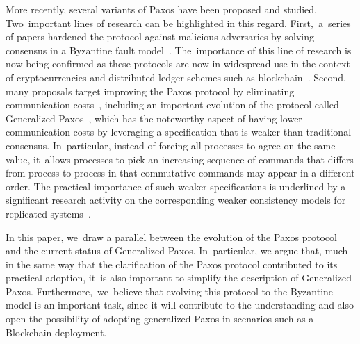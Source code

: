 \documentclass[algorithms,article,accept,moreauthors,pdftex,10pt,a4paper]{Definitions/mdpi}
\begin{document}
More recently, several variants of Paxos have been proposed and
studied. Two~important lines of research can be highlighted in this
regard. First,~a~series of papers hardened the protocol against
malicious adversaries by solving consensus in a Byzantine fault
model~\cite{CL99,Lamport2011}. The~importance of this line of
research is now being confirmed as these protocols are now in widespread
use in the context of cryptocurrencies and distributed ledger
schemes such as blockchain~\cite{bitcoin}.
Second, many proposals target improving
the Paxos protocol by eliminating communication costs~\cite{L06},
including an important evolution of the protocol called Generalized
Paxos~\cite{Lamport2005}, which has the noteworthy aspect of
having lower communication costs by leveraging a specification that is
weaker than traditional consensus. In~particular, instead of forcing all
processes to agree on the same value, it~allows processes to pick an
increasing sequence of commands that differs from process to process
in that commutative commands may appear in a different order.
The practical importance of such weaker specifications is underlined
by a significant research activity on the corresponding weaker consistency
models for replicated systems~\cite{LLS90,dynamo}.



In this paper, we~draw a parallel between the evolution of the Paxos
protocol and the current status of Generalized Paxos. In~particular,
we argue that, much in the same way that the clarification of the Paxos
protocol contributed to its practical adoption, it~is also important
to simplify the description of Generalized Paxos. Furthermore,~we~believe
that evolving this protocol to the Byzantine model is an important
task, since it will contribute to the understanding
and also open the possibility of adopting generalized Paxos in
scenarios such as a Blockchain deployment.
\end{document}
